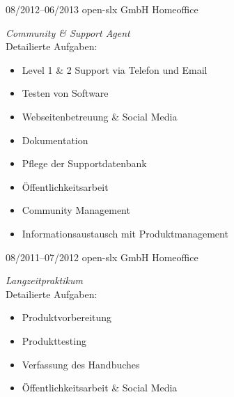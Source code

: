 \documentclass[a4paper,latin]{friggeri-cv} %
\begin{document}
\begin{entrylist}
{}
\entry
{08/2012--06/2013}
{open-slx GmbH}
{Homeoffice}
{\emph{Community \& Support Agent} \\
Detailierte Aufgaben:
\begin{itemize}
\item Level 1 \& 2 Support via Telefon und Email
\item Testen von Software
\item Webseitenbetreuung \& Social Media
\item Dokumentation
\item Pflege der Supportdatenbank
\item Öffentlichkeitsarbeit
\item Community Management
\item Informationsaustausch mit Produktmanagement
\end{itemize}
}
\entry
{08/2011--07/2012}
{open-slx GmbH}
{Homeoffice}
{\emph{Langzeitpraktikum} \\
Detailierte Aufgaben:
\begin{itemize}
\item Produktvorbereitung
\item Produkttesting
\item Verfassung des Handbuches
\item Öffentlichkeitsarbeit \& Social Media
\end{itemize}
}
\end{entrylist}
\end{document}
